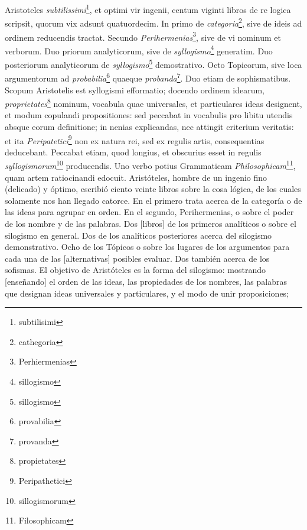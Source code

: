 \documentclass{article}
\begin{document}
\vspace{0.5cm}

\begin{paracol}{2}
Aristoteles \emph{subtilissimi}\footnote{subtilisimi}, et optimi vir ingenii, centum viginti libros de re logica scripsit, quorum vix adsunt quatuordecim. In primo de \emph{categoria}\footnote{cathegoria}, sive de ideis ad ordinem reducendis tractat. Secundo \emph{Perihermenias}\footnote{Perhiermenias}, sive de vi nominum et verborum. Duo priorum analyticorum, sive de \emph{syllogismo}\footnote{sillogismo} generatim. Duo posteriorum analyticorum de \emph{syllogismo}\footnote{sillogismo} demostrativo. Octo Topicorum, sive loca argumentorum ad \emph{probabilia}\footnote{provabilia} quaeque \emph{probanda}\footnote{provanda}. Duo etiam de sophismatibus. Scopum Aristotelis est syllogismi efformatio; docendo ordinem idearum, \emph{proprietates}\footnote{propietates} nominum, vocabula quae universales, et particulares ideas designent, et modum copulandi propositiones: sed peccabat in vocabulis pro libitu utendis absque eorum definitione; in nenias explicandas, nec attingit criterium veritatis: et ita \emph{Peripatetici}\footnote{Peripathetici} non ex natura rei, sed ex regulis artis, consequentias deducebant. Peccabat etiam, quod longius, et obscurius esset in regulis \emph{syllogismorum}\footnote{sillogismorum} producendis. Uno verbo potius Grammaticam \emph{Philosophicam}\footnote{Filosophicam}, quam artem ratiocinandi edocuit.
\switchcolumn
Aristóteles, hombre de un ingenio fino (delicado) y óptimo, escribió ciento veinte libros sobre la cosa lógica, de los cuales solamente nos han llegado catorce. En el primero trata acerca de la categoría o de las ideas para agrupar en orden. En el segundo, Perihermenias, o sobre el poder de los nombre y de las palabras. Dos [libros] de los primeros analíticos o sobre el silogismo en general. Dos de los analíticos posteriores acerca del silogismo demonstrativo. Ocho de los Tópicos o sobre los lugares de los argumentos para cada una de las [alternativas] posibles evaluar. Dos también acerca de los sofismas. El objetivo de Aristóteles es la forma del silogismo: mostrando [enseñando] el orden de las ideas, las propiedades de los nombres, las palabras que designan ideas universales y particulares, y el modo de unir proposiciones; 
\end{paracol}

\vspace{0.5cm}
\end{document}
